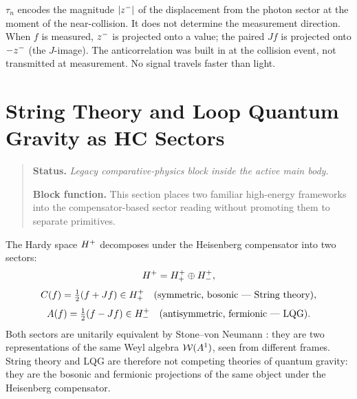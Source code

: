 \begin{remark}
$\tau_n$ encodes the magnitude $|z^-|$ of the displacement from the
photon sector at the moment of the near-collision.
It does not determine the measurement direction.
When $f$ is measured, $z^-$ is projected onto a value; the paired
$Jf$ is projected onto $-z^-$ (the $J$-image).
The anticorrelation was built in at the collision event, not transmitted
at measurement. No signal travels faster than light.
\end{remark}


\section{String Theory and Loop Quantum Gravity as HC Sectors}
\begin{quote}\small
\noindent\textbf{Status.} \emph{Legacy comparative-physics block inside the active main body.}\par
\noindent\textbf{Block function.} This section places two familiar high-energy frameworks into the compensator-based sector reading without promoting them to separate primitives.
\end{quote}
\label{sec:stringlqg}

\begin{theorem}
\label{thm:string-lqg-duality}
The Hardy space $H^+$ decomposes under the Heisenberg compensator
into two sectors:
\[
  H^+ = H^+_+\oplus H^+_-,
\]
\[
  C(f) = \tfrac{1}{2}(f+Jf)\in H^+_+
  \quad\text{(symmetric, bosonic --- String theory)},
\]
\[
  A(f) = \tfrac{1}{2}(f-Jf)\in H^+_-
  \quad\text{(antisymmetric, fermionic --- LQG)}.
\]
Both sectors are unitarily equivalent by Stone--von Neumann
\cite{brendecke2026rh}: they are two representations of the same
Weyl algebra $\mathcal{W}(A^1)$, seen from different frames.
String theory and LQG are therefore not competing theories of quantum
gravity: they are the bosonic and fermionic projections of the same
object under the Heisenberg compensator.
\end{theorem}

